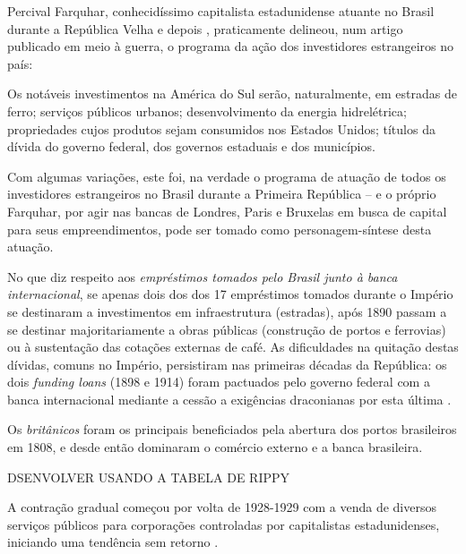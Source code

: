 Percival Farquhar, conhecidíssimo capitalista estadunidense atuante no Brasil durante a República Velha e depois \cite[pp~28, 35-41, 53-54, 60-61, 76, 83-84, 121, 150-152]{CUNHA2011}, praticamente delineou, num artigo publicado em meio à guerra, o programa da ação dos investidores estrangeiros no país:

\begin{citacao}
Os notáveis investimentos na América do Sul serão, naturalmente, em estradas de ferro; serviços públicos urbanos; desenvolvimento da energia hidrelétrica; propriedades cujos produtos sejam consumidos nos Estados Unidos; títulos da dívida do governo federal, dos governos estaduais e dos municípios. \cite[p.~398]{farquhar_invest_1916}
\end{citacao}

Com algumas variações, este foi, na verdade o programa de atuação de todos os investidores estrangeiros no Brasil durante a Primeira República -- e o próprio Farquhar, por agir nas bancas de Londres, Paris e Bruxelas em busca de capital para seus empreendimentos, pode ser tomado como personagem-síntese desta atuação.

No que diz respeito aos \textit{empréstimos tomados pelo Brasil junto à banca internacional}, se apenas dois dos dos 17 empréstimos tomados durante o Império se destinaram a investimentos em infraestrutura (estradas), após 1890 passam a se destinar majoritariamente a obras públicas (construção de portos e ferrovias) ou à sustentação das cotações externas de café. As dificuldades na quitação destas dívidas, comuns no Império, persistiram nas primeiras décadas da República: os dois \textit{funding loans} (1898 e 1914) foram pactuados pelo governo federal com a banca internacional mediante a cessão a exigências draconianas por esta última \cite[p.~365]{singer_braecomu_1977}.

Os \textit{britânicos} foram os principais beneficiados pela abertura dos portos brasileiros em 1808, e desde então dominaram o comércio externo e a banca brasileira.

DSENVOLVER USANDO A TABELA DE RIPPY

A contração gradual começou por volta de 1928-1929 com a venda de diversos serviços públicos para corporações controladas por capitalistas estadunidenses, iniciando uma tendência sem retorno \cite{rippy_britlat_1954}.


